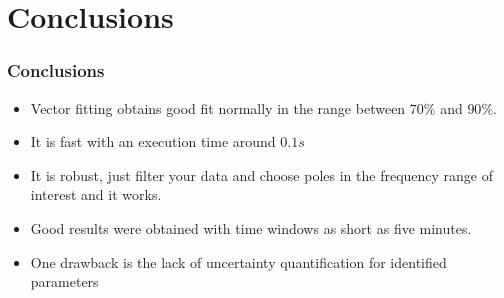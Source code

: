 \section{Conclusions}
\begin{frame}
	\frametitle{Conclusions}
	\begin{itemize}
		\item<1-> Vector fitting obtains good fit normally in the range between $70\%$ and $90\%$.
		\item<2-> It is fast with an execution time around $0.1s$
		\item<3-> It is robust, just filter your data and choose poles in the frequency range of interest and it works.
		\item<4-> Good results were obtained with time windows as short as five minutes.
		\item<5-> One drawback is the lack of uncertainty quantification for identified parameters
	\end{itemize}
\end{frame}	

